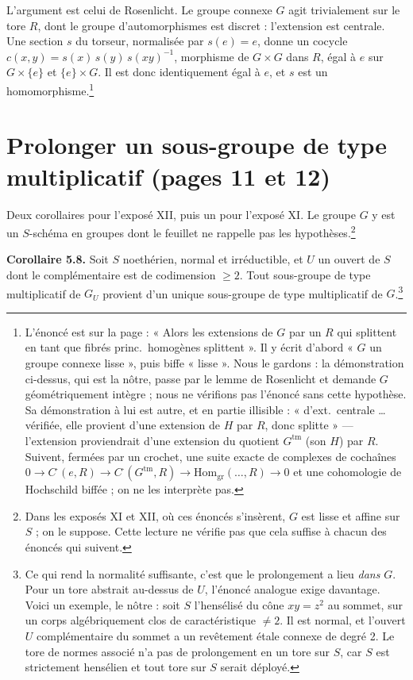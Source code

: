 \documentclass[11pt,a4paper]{article}
\begin{document}
L'argument est celui de Rosenlicht. Le groupe connexe $G$ agit trivialement
sur le tore $R$, dont le groupe d'automorphismes est discret : l'extension
est centrale. Une section $s$ du torseur, normalisée par $s(e) = e$, donne un
cocycle $c(x, y) = s(x)\, s(y)\, s(xy)^{-1}$, morphisme de $G \times G$ dans
$R$, égal à $e$ sur $G \times \{e\}$ et $\{e\} \times G$. Il est donc
identiquement égal à $e$, et $s$ est un homomorphisme.\footnote{L'énoncé est
sur la page : « Alors les extensions de $G$ par un $R$ qui splittent en tant
que fibrés princ.\ homogènes splittent ». Il y écrit d'abord « $G$ un groupe
connexe lisse », puis biffe « lisse ». Nous le gardons : la démonstration
ci-dessus, qui est la nôtre, passe par le lemme de Rosenlicht et demande $G$
géométriquement intègre ; nous ne vérifions pas l'énoncé sans cette
hypothèse. Sa démonstration à lui est autre, et en partie illisible :
« d'ext.\ centrale … vérifiée, elle provient d'une extension de $H$ par $R$,
donc splitte » --- l'extension proviendrait d'une extension du quotient
$G^{\mathrm{tm}}$ (son $H$) par $R$. Suivent, fermées par un
crochet, une suite exacte de complexes de cochaînes
$0 \to C^{\cdot}(e, R) \to C^{\cdot}(G^{\mathrm{tm}}, R) \to
\mathrm{Hom}_{\mathrm{gr}}(\ldots, R) \to 0$ et une cohomologie de
Hochschild biffée ; on ne les interprète pas.}

\section*{Prolonger un sous-groupe de type multiplicatif (pages 11 et 12)}

Deux corollaires pour l'exposé XII, puis un pour l'exposé XI. Le groupe $G$ y
est un $S$-schéma en groupes dont le feuillet ne rappelle pas les
hypothèses.\footnote{Dans les exposés XI et XII, où ces énoncés s'insèrent, $G$
est lisse et affine sur $S$ ; on le suppose. Cette lecture ne vérifie pas que
cela suffise à chacun des énoncés qui suivent.}

\textbf{Corollaire 5.8.} Soit $S$ noethérien, normal et irréductible, et $U$
un ouvert de $S$ dont le complémentaire est de codimension $\geqslant 2$. Tout
sous-groupe de type multiplicatif de $G_{U}$ provient d'un unique sous-groupe
de type multiplicatif de $G$.\footnote{Ce qui rend la normalité suffisante,
c'est que le prolongement a lieu \emph{dans} $G$. Pour un tore abstrait
au-dessus de $U$, l'énoncé analogue exige davantage. Voici un exemple, le
nôtre : soit $S$ l'hensélisé du cône $xy = z^{2}$ au sommet, sur un corps
algébriquement clos de caractéristique $\neq 2$. Il est normal, et
l'ouvert $U$ complémentaire du sommet a un revêtement étale connexe de degré
2. Le tore de normes associé n'a pas de prolongement en un tore sur $S$, car
$S$ est strictement hensélien et tout tore sur $S$ serait déployé.}
\end{document}

